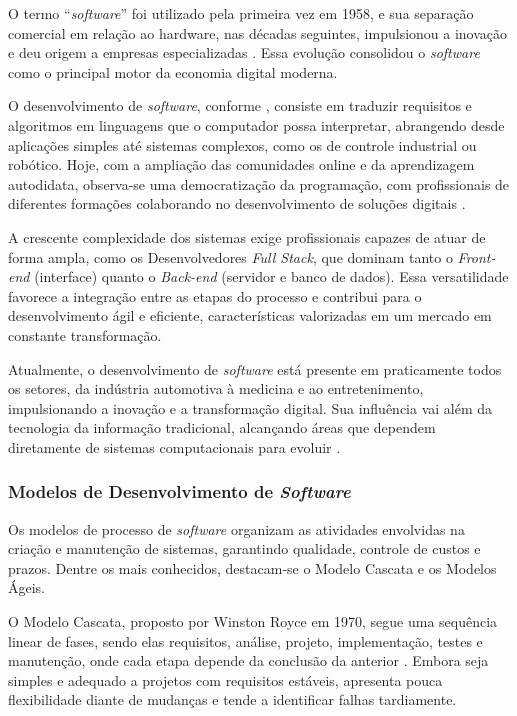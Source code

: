 \documentclass[english,brazilian]{UNISINOSartigo} %
\begin{document}
O termo “\textit{software}” foi utilizado pela primeira vez em 1958, e sua separação comercial em relação ao hardware, nas décadas seguintes, impulsionou a inovação e deu origem a empresas especializadas \cite{maynard2015, sakurai2018}. Essa evolução consolidou o \textit{software} como o principal motor da economia digital moderna.

O desenvolvimento de \textit{software}, conforme \cite{schwab2019}, consiste em traduzir requisitos e algoritmos em linguagens que o computador possa interpretar, abrangendo desde aplicações simples até sistemas complexos, como os de controle industrial ou robótico. Hoje, com a ampliação das comunidades online e da aprendizagem autodidata, observa-se uma democratização da programação, com profissionais de diferentes formações colaborando no desenvolvimento de soluções digitais \cite{candido2022}.

A crescente complexidade dos sistemas exige profissionais capazes de atuar de forma ampla, como os Desenvolvedores \textit{Full Stack}, que dominam tanto o \textit{Front-end} (interface) quanto o \textit{Back-end} (servidor e banco de dados). Essa versatilidade favorece a integração entre as etapas do processo e contribui para o desenvolvimento ágil e eficiente, características valorizadas em um mercado em constante transformação.

Atualmente, o desenvolvimento de \textit{software} está presente em praticamente todos os setores, da indústria automotiva à medicina e ao entretenimento, impulsionando a inovação e a transformação digital. Sua influência vai além da tecnologia da informação tradicional, alcançando áreas que dependem diretamente de sistemas computacionais para evoluir \cite{schwab2019}.

\subsubsection{Modelos de Desenvolvimento de \textit{Software}}

Os modelos de processo de \textit{software} organizam as atividades envolvidas na criação e manutenção de sistemas, garantindo qualidade, controle de custos e prazos. Dentre os mais conhecidos, destacam-se o Modelo Cascata e os Modelos Ágeis.

O Modelo Cascata, proposto por Winston Royce em 1970, segue uma sequência linear de fases, sendo elas requisitos, análise, projeto, implementação, testes e manutenção, onde cada etapa depende da conclusão da anterior \cite{sommerville2011}. Embora seja simples e adequado a projetos com requisitos estáveis, apresenta pouca flexibilidade diante de mudanças e tende a identificar falhas tardiamente.
\end{document}
